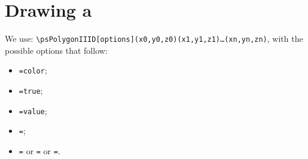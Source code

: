 \section{Drawing a }

We use: \texttt{\textbackslash psPolygonIIID[options](x0,y0,z0)(x1,y1,z1)\ldots(xn,yn,zn)},
with the possible options that follow:
\begin{itemize}
  \item \texttt{=color};
  \item \texttt{=true};
  \item \texttt{=value};
  \item \texttt{=};
  \item \texttt{=} or \texttt{=} or \texttt{=}.
\end{itemize}

\endinput
